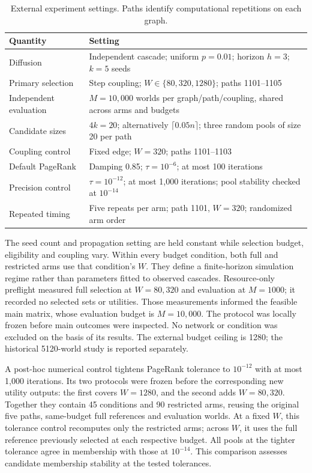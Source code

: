 \documentclass[smallextended]{svjour3}
\begin{document}
\begin{table}[htbp]
\caption{External experiment settings. Paths identify computational repetitions on each graph.}\label{tab:settings}
\begin{tabularx}{\linewidth}{lX}
\toprule
Quantity & Setting \\
\midrule
Diffusion & Independent cascade; uniform $p=0.01$; horizon $h=3$; $k=5$ seeds \\
Primary selection & Step coupling; $W\in\{80,320,1280\}$; paths 1101--1105 \\
Independent evaluation & $M=10,000$ worlds per graph/path/coupling, shared across arms and budgets \\
Candidate sizes & $4k=20$; alternatively $\lceil0.05n\rceil$; three random pools of size 20 per path \\
Coupling control & Fixed edge; $W=320$; paths 1101--1103 \\
Default PageRank & Damping 0.85; $\tau=10^{-6}$; at most 100 iterations \\
Precision control & $\tau=10^{-12}$; at most 1,000 iterations; pool stability checked at $10^{-14}$ \\
Repeated timing & Five repeats per arm; path 1101, $W=320$; randomized arm order \\
\bottomrule
\end{tabularx}
\end{table}

The seed count and propagation setting are held constant while selection budget, eligibility and coupling vary. Within every budget condition, both full and restricted arms use that condition's $W$. They define a finite-horizon simulation regime rather than parameters fitted to observed cascades. Resource-only preflight measured full selection at $W=80,320$ and evaluation at $M=1000$; it recorded no selected sets or utilities. Those measurements informed the feasible main matrix, whose evaluation budget is $M=10,000$. The protocol was locally frozen before main outcomes were inspected. No network or condition was excluded on the basis of its results. The external budget ceiling is 1280; the historical 5120-world study is reported separately.

A post-hoc numerical control tightens PageRank tolerance to $10^{-12}$ with at most 1,000 iterations. Its two protocols were frozen before the corresponding new utility outputs: the first covers $W=1280$, and the second adds $W=80,320$. Together they contain 45 conditions and 90 restricted arms, reusing the original five paths, same-budget full references and evaluation worlds. At a fixed $W$, this tolerance control recomputes only the restricted arms; across $W$, it uses the full reference previously selected at each respective budget. All pools at the tighter tolerance agree in membership with those at $10^{-14}$. This comparison assesses candidate membership stability at the tested tolerances.
\end{document}
